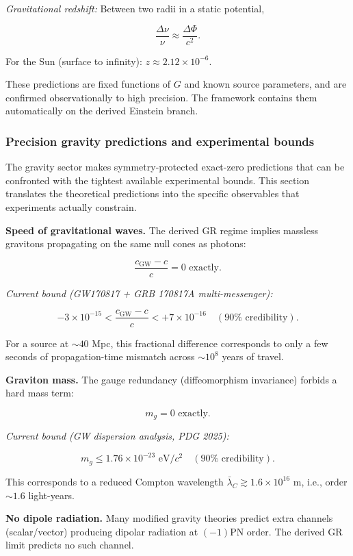 \emph{Gravitational redshift:} Between two radii in a static potential,

\[
\frac{\Delta\nu}{\nu} \approx \frac{\Delta\Phi}{c^2}.
\]

For the Sun (surface to infinity): \(z \approx 2.12 \times 10^{-6}\).

These predictions are fixed functions of \(G\) and known source parameters, and are confirmed observationally to high precision. The framework contains them automatically on the derived Einstein branch.

\subsubsection{Precision gravity predictions and experimental bounds}\label{513-precision-gravity-predictions-and-experimental-bounds}

The gravity sector makes symmetry-protected exact-zero predictions that can be confronted with the tightest available experimental bounds. This section translates the theoretical predictions into the specific observables that experiments actually constrain.

\textbf{Speed of gravitational waves.} The derived GR regime implies massless gravitons propagating on the same null cones as photons:

\[
\frac{c_{\mathrm{GW}} - c}{c} = 0 \text{ exactly.}
\]

\emph{Current bound (GW170817 + GRB 170817A multi-messenger):}

\[
-3 \times 10^{-15} < \frac{c_{\mathrm{GW}} - c}{c} < +7 \times 10^{-16}
\quad (90\% \text{ credibility}).
\]

For a source at \(\sim 40\) Mpc, this fractional difference corresponds to only a few seconds of propagation-time mismatch across \(\sim 10^8\) years of travel.

\textbf{Graviton mass.} The gauge redundancy (diffeomorphism invariance) forbids a hard mass term:

\[
m_g = 0 \text{ exactly.}
\]

\emph{Current bound (GW dispersion analysis, PDG 2025):}

\[
m_g \le 1.76 \times 10^{-23} \text{ eV}/c^2 \quad (90\% \text{ credibility}).
\]

This corresponds to a reduced Compton wavelength \(\bar{\lambda}_C \gtrsim 1.6 \times 10^{16}\) m, i.e., order \(\sim 1.6\) light-years.

\textbf{No dipole radiation.} Many modified gravity theories predict extra channels (scalar/vector) producing dipolar radiation at \((-1)\)PN order. The derived GR limit predicts no such channel.

